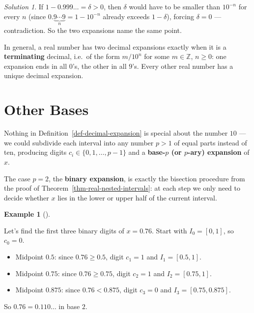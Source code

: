 \documentclass[
  letterpaper,
  DIV=11,
  numbers=noendperiod]{scrreprt}
\providecommand{\tightlist}{%
  \setlength{\itemsep}{0pt}\setlength{\parskip}{0pt}}
\theoremstyle{plain}
\theoremstyle{plain}
\theoremstyle{definition}
\theoremstyle{definition}
\theoremstyle{definition}
\newtheorem{example}{Example}[chapter]
\theoremstyle{plain}
\theoremstyle{plain}
\theoremstyle{remark}
\newtheorem*{solution}{Solution}
\begin{document}
\begin{solution}
If \(1 - 0.999\ldots = \delta > 0\), then \(\delta\) would have to be
smaller than \(10^{-n}\) for every \(n\) (since
\(0.\underbrace{9\cdots9}_{n} = 1 - 10^{-n}\) already exceeds
\(1-\delta\)), forcing \(\delta=0\) --- contradiction. So the two
expansions name the same point.

In general, a real number has two decimal expansions exactly when it is
a \textbf{terminating} decimal, i.e.~of the form \(m/10^n\) for some
\(m\in\mathbb{Z}\), \(n\ge0\): one expansion ends in all \(0\)'s, the
other in all \(9\)'s. Every other real number has a unique decimal
expansion.
\end{solution}

\section{Other Bases}\label{other-bases}

Nothing in Definition~\ref{def-decimal-expansion} is special about the
number \(10\) --- we could subdivide each interval into any number
\(p>1\) of equal parts instead of ten, producing digits
\(c_i \in \{0,1,\dots,p-1\}\) and a \textbf{base-\(p\) (or \(p\)-ary)
expansion} of \(x\).

The case \(p=2\), the \textbf{binary expansion}, is exactly the
bisection procedure from the proof of
Theorem~\ref{thm-real-nested-intervals}: at each step we only need to
decide whether \(x\) lies in the lower or upper half of the current
interval.

\begin{example}[]\protect\hypertarget{exm-binary-expansion}{}\label{exm-binary-expansion}

\hfill\break
Let's find the first three binary digits of \(x=0.76\). Start with
\(I_0=[0,1]\), so \(c_0=0\).

\begin{itemize}
\tightlist
\item
  Midpoint \(0.5\): since \(0.76 \ge 0.5\), digit \(c_1=1\) and
  \(I_1=[0.5,1]\).
\item
  Midpoint \(0.75\): since \(0.76 \ge 0.75\), digit \(c_2=1\) and
  \(I_2=[0.75,1]\).
\item
  Midpoint \(0.875\): since \(0.76 < 0.875\), digit \(c_3=0\) and
  \(I_3=[0.75,0.875]\).
\end{itemize}

So \(0.76 = 0.110\ldots\) in base \(2\).

\end{example}
\end{document}
